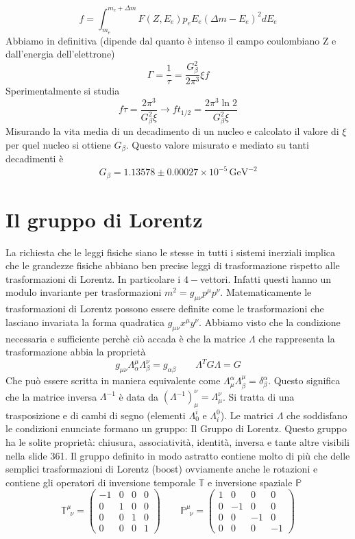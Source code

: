 $$
f = \int_{m_e}^{m_e+\Delta m} F(Z, E_e) p_e E_e (\Delta m - E_e)^2 dE_e
$$
Abbiamo in definitiva (dipende dal quanto è intenso il campo coulombiano Z e dall'energia dell'elettrone)
$$
\Gamma = \frac{1}{\tau} = \frac{G_\beta^2}{2\pi^3} \xi f
$$
Sperimentalmente si studia
$$
f\tau = \frac{2\pi^3}{G_\beta^2 \xi}\to ft_{1/2} = \frac{2\pi^3 \ln 2}{G_\beta^2 \xi}
$$
Misurando la vita media di un decadimento di un nucleo e calcolato il valore di $\xi$ per quel nucleo si ottiene $G_\beta$. Questo valore misurato e mediato su tanti decadimenti è
$$
G_\beta = 1.13578 \pm 0.00027 \times 10^{-5} \, \text{GeV}^{-2}
$$
\section{Il gruppo di Lorentz}
La richiesta che le leggi fisiche siano le stesse in tutti i sistemi inerziali implica che le grandezze fisiche abbiano ben precise leggi di trasformazione rispetto alle trasformazioni di Lorentz. In particolare i $4-$vettori. Infatti questi hanno un modulo invariante per trasformazioni $m^2 = g_{\mu\nu} p^\mu p^\nu$. Matematicamente le trasformazioni di Lorentz possono essere definite come le trasformazioni che lasciano invariata la forma quadratica $g_{\mu\nu}x^\mu y^\nu$. Abbiamo visto che la condizione necessaria e sufficiente perchè ciò accada è che la matrice $\Lambda$ che rappresenta la trasformazione abbia la proprietà
$$
g_{\mu\nu} \Lambda^\mu_\alpha \Lambda^\nu_\beta = g_{\alpha\beta} \qquad \Lambda^T G \Lambda = G
$$
Che può essere scritta in maniera equivalente come $\Lambda_\mu^\alpha \Lambda^\mu_\beta = \delta^\alpha_\beta$. Questo significa che la matrice inversa $\Lambda^{-1}$ è data da $(\Lambda^{-1})^\nu_\mu = \Lambda_\mu^\nu$. Si tratta di una trasposizione e di cambi di segno (elementi $\Lambda_0^i$ \quad e $\Lambda_i^0$). Le matrici $\Lambda$ che soddisfano le condizioni enunciate formano un gruppo: Il Gruppo di Lorentz. Questo gruppo ha le solite proprietà: chiusura, associatività, identità, inversa e tante altre visibili nella slide 361. Il gruppo definito in modo astratto contiene molto di più che delle semplici trasformazioni di Lorentz (boost) ovviamente anche le rotazioni e contiene gli operatori di inversione temporale $\mathbb{T}$ e inversione spaziale $\mathbb{P}$
$$
\mathbb{T}^\mu_{\,\,\,\nu} = \begin{pmatrix}
	-1 & 0 & 0 & 0 \\
	0 & 1 & 0 & 0 \\
	0 & 0 & 1 & 0 \\
	0 & 0 & 0 & 1
\end{pmatrix} \qquad \mathbb{P}^\mu_{\,\,\,\nu} = \begin{pmatrix}
1 & 0 & 0 & 0 \\
0 & -1 & 0 & 0 \\
0 & 0 & -1 & 0 \\
0 & 0 & 0 & -1
\end{pmatrix}
$$
